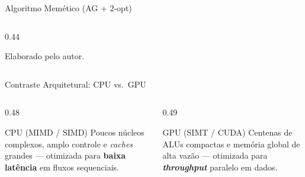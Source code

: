 \begin{frame}{Algoritmo Memético (AG + $2$-opt)}
\begin{columns}[c,onlytextwidth]
\begin{column}{0.44\textwidth}
{%
      }{Elaborado pelo autor.}
    \end{column}
  \end{columns}
\end{frame}

\begin{frame}{Contraste Arquitetural: CPU vs.\ GPU \autocite{flynn1972taxonomy}}
  \begin{columns}[T,onlytextwidth]
    \begin{column}{0.48\textwidth}
      \vspace{0.1cm}
      \begin{block}{CPU (MIMD / SIMD)}
        Poucos núcleos complexos, amplo controle e \emph{caches} grandes — otimizada para \textbf{baixa latência} em fluxos sequenciais.
      \end{block}
    \end{column}
    \begin{column}{0.49\textwidth}
      \vspace{0.1cm}
      \begin{block}{GPU (SIMT / CUDA)}
        Centenas de ALUs compactas e memória global de alta vazão — otimizada para \textbf{\emph{throughput}} paralelo em dados.
      \end{block}
    \end{column}
  \end{columns}
\end{frame}

